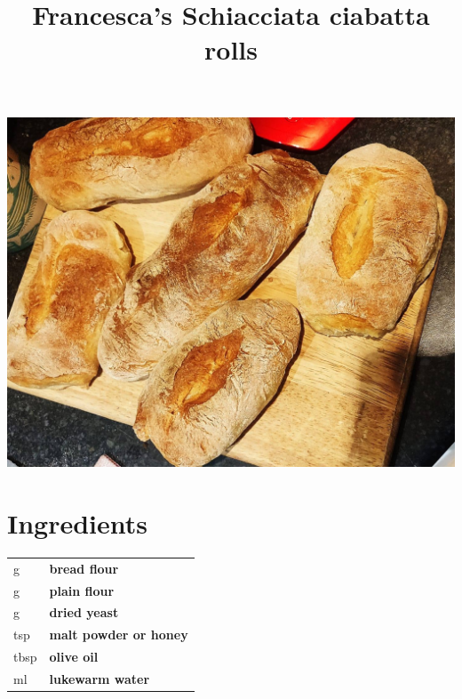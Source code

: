 \documentclass[main.tex]{subfiles}
\title{Francesca's Schiacciata ciabatta rolls}
\begin{document}
\maketitle%


\begin{marginfigure}%
  \includegraphics[width=\linewidth]{francesca-ciabatta.jpg}
\end{marginfigure}

\section{Ingredients}

\vspace*{-\baselineskip}
\begin{table}[ht]
	\begin{tabularx}{\textwidth}{>{\hsize=0.333\hsize}X>{\bf\hsize=1\hsize}X}
	\unit[200]{g} & bread flour\\
	\unit[200]{g} & plain flour\\
	\unit[7]{g} & dried yeast\\
	\unit[1]{tsp} & malt powder or honey\\
	\unit[2]{tbsp} & olive oil\\
	\unit[300]{ml} & lukewarm water\\
	\end{tabularx}
\end{table}
\end{document}
